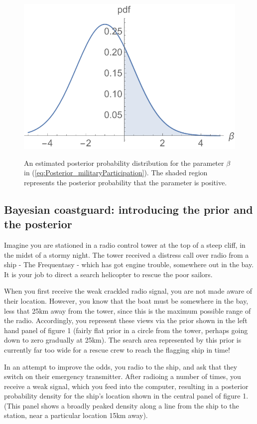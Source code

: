 \documentclass[11pt,fullpage]{book}
\begin{document}
\begin{figure}
\centering
\scalebox{0.5} 
{\includegraphics{Posterior_regressionMilitaryParticipation.pdf}}
\caption{An estimated posterior probability distribution for the parameter $\beta$ in (\ref{eq:Posterior_militaryParticipation}). The shaded region represents the posterior probability that the parameter is positive.}\label{fig:Posterior_regressionMilitaryParticipation}
\end{figure}

\subsection{Bayesian coastguard: introducing the prior and the posterior}
Imagine you are stationed in a radio control tower at the top of a steep cliff, in the midst of a stormy night. The tower received a distress call over radio from a ship - The Frequentasy - which has got engine trouble, somewhere out in the bay. It is your job to direct a search helicopter to rescue the poor sailors.

When you first receive the weak crackled radio signal, you are not made aware of their location. However, you know that the boat must be somewhere in the bay, less that 25km away from the tower, since this is the maximum possible range of the radio. Accordingly, you represent these views via the prior shown in the left hand panel of figure 1 (fairly flat prior in a circle from the tower, perhaps going down to zero gradually at 25km). The search area represented by this prior is currently far too wide for a rescue crew to reach the flagging ship in time!

In an attempt to improve the odds, you radio to the ship, and ask that they switch on their emergency transmitter. After radioing a number of times, you receive a weak signal, which you feed into the computer, resulting in a posterior probability density for the ship's location shown in the central panel of figure 1. (This panel shows a broadly peaked density along a line from the ship to the station, near a particular location 15km away).
\end{document}
